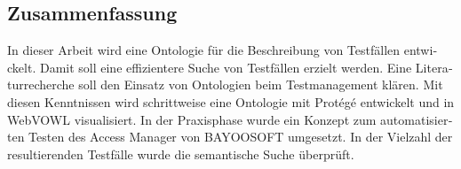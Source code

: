 \begin{otherlanguage}{ngerman}
	\chapter*{Zusammenfassung}
	In dieser Arbeit wird eine Ontologie für die Beschreibung von Testfällen entwickelt. Damit soll eine effizientere Suche von Testfällen erzielt werden. Eine Literaturrecherche soll den Einsatz von Ontologien beim Testmanagement klären. Mit diesen Kenntnissen wird schrittweise eine Ontologie mit Protégé entwickelt und in WebVOWL visualisiert. In der Praxisphase wurde ein Konzept zum automatisierten Testen des Access Manager von BAYOOSOFT umgesetzt. In der Vielzahl der resultierenden Testfälle wurde die semantische Suche überprüft. 
\end{otherlanguage}
